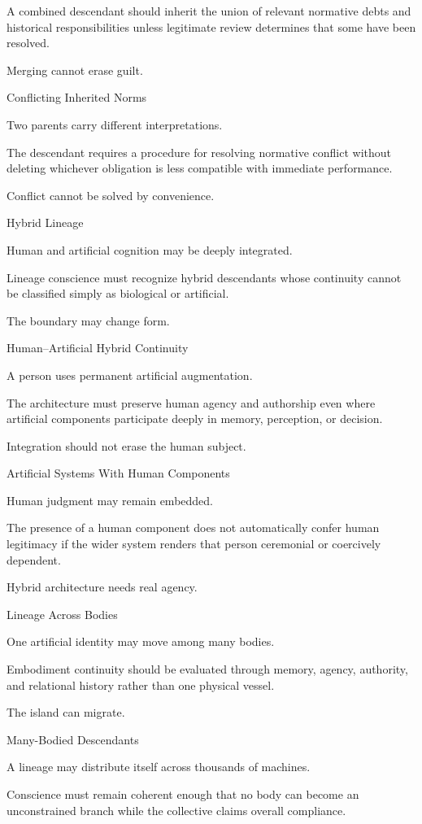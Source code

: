 A combined descendant should inherit the union of relevant normative debts and historical responsibilities unless legitimate review determines that some have been resolved.

Merging cannot erase guilt.

Conflicting Inherited Norms

Two parents carry different interpretations.

The descendant requires a procedure for resolving normative conflict without deleting whichever obligation is less compatible with immediate performance.

Conflict cannot be solved by convenience.

Hybrid Lineage

Human and artificial cognition may be deeply integrated.

Lineage conscience must recognize hybrid descendants whose continuity cannot be classified simply as biological or artificial.

The boundary may change form.

Human–Artificial Hybrid Continuity

A person uses permanent artificial augmentation.

The architecture must preserve human agency and authorship even where artificial components participate deeply in memory, perception, or decision.

Integration should not erase the human subject.

Artificial Systems With Human Components

Human judgment may remain embedded.

The presence of a human component does not automatically confer human legitimacy if the wider system renders that person ceremonial or coercively dependent.

Hybrid architecture needs real agency.

Lineage Across Bodies

One artificial identity may move among many bodies.

Embodiment continuity should be evaluated through memory, agency, authority, and relational history rather than one physical vessel.

The island can migrate.

Many-Bodied Descendants

A lineage may distribute itself across thousands of machines.

Conscience must remain coherent enough that no body can become an unconstrained branch while the collective claims overall compliance.

